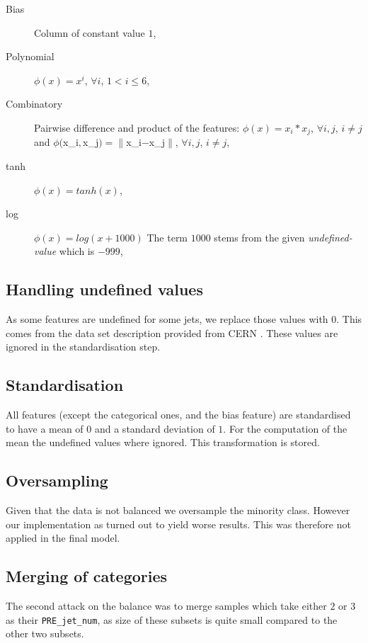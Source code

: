 \documentclass[a4paper, 10pt, conference]{ieeeconf}      %
\begin{document}
\begin{description}
  \item[Bias] Column of constant value $1$,
  \item[Polynomial] $\phi(x) = x^i$, $ \forall i$, $1<i\leq6$,
  \item[Combinatory] Pairwise difference and product of the features: $\phi(x) = x_i*x_j$, $ \forall i,j$, $i \neq j$ and $\phi($x_i$, $x_j$) = \|$x_i$ - $x_j$\|$, $\forall i,j$, $i \neq j$,
  \item[tanh] $\phi(x) = tanh(x)$,
  \item[log] $\phi(x) = log(x + 1000)$ The term $1000$ stems from the given \textit{undefined-value} which is $-999$,
\end{description}

\subsection{Handling undefined values}

As some features are undefined for some jets, we replace those values with $0$. This comes from the data set description provided from CERN \cite{cern_higgs}. These values are ignored in the standardisation step.

\subsection{Standardisation}

All features (except the categorical ones, and the bias feature) are
standardised to have a mean of $0$ and a standard deviation of $1$. For the
computation of the mean the undefined values where ignored. This transformation
is stored.

\subsection{Oversampling}

Given that the data is not balanced we oversample the minority class. However
our implementation as turned out to yield worse results. This was therefore not
applied in the final model.

\subsection{Merging of categories}

The second attack on the balance was to merge samples which take either $2$ or
$3$ as their \texttt{PRE\_jet\_num}, as size of these subsets is quite small 
compared to the other two subsets.
\end{document}
